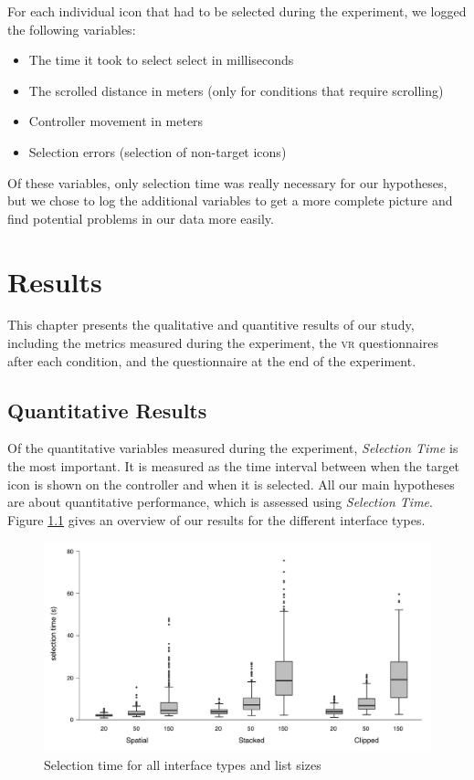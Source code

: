 \documentclass[nobib]{tufte-book} %
\begin{document}
For each individual icon that had to be selected during the experiment, we logged the following variables:

\begin{itemize}
  \item The time it took to select select in milliseconds
  \item The scrolled distance in meters (only for conditions that require scrolling)
  \item Controller movement in meters
  \item Selection errors (selection of non-target icons)
\end{itemize}


Of these variables, only selection time was really necessary for our hypotheses, but we chose to log the additional variables to get a more complete picture and find potential problems in our data more easily.



\chapter{Results}
\label{ch:results}

This chapter presents the qualitative and quantitive results of our study, including the metrics measured during the experiment, the \textsc{vr} questionnaires after each condition, and the questionnaire at the end of the experiment.

\section{Quantitative Results}
Of the quantitative variables measured during the experiment, \emph{Selection Time} is the most important. It is measured as the time interval between when the target icon is shown on the controller and when it is selected. All our main hypotheses are about quantitative performance, which is assessed using \emph{Selection Time}. Figure \ref{fig:all-durations-chart} gives an overview of our results for the different interface types.

\begin{figure}[h]
  \includegraphics[width=\linewidth]{all-durations.pdf}
  \caption{Selection time for all interface types and list sizes}
  \label{fig:all-durations-chart}
\end{figure}
\end{document}
